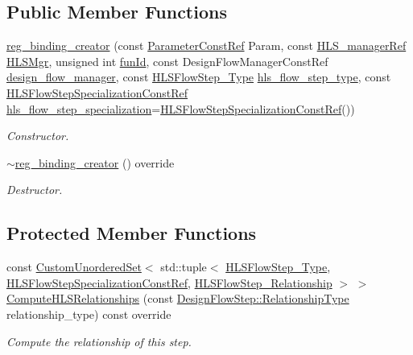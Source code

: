 \subsection*{Public Member Functions}
\begin{DoxyCompactItemize}
\item 
\hyperlink{classreg__binding__creator_a2bb802408ad2ffe32277d65edf50d171}{reg\+\_\+binding\+\_\+creator} (const \hyperlink{Parameter_8hpp_a37841774a6fcb479b597fdf8955eb4ea}{Parameter\+Const\+Ref} Param, const \hyperlink{hls__manager_8hpp_acd3842b8589fe52c08fc0b2fcc813bfe}{H\+L\+S\+\_\+manager\+Ref} \hyperlink{classHLS__step_ade85003a99d34134418451ddc46a18e9}{H\+L\+S\+Mgr}, unsigned int \hyperlink{classHLSFunctionStep_a3e6434fd86c698b0c70520b859bff5b0}{fun\+Id}, const Design\+Flow\+Manager\+Const\+Ref \hyperlink{classDesignFlowStep_ab770677ddf087613add30024e16a5554}{design\+\_\+flow\+\_\+manager}, const \hyperlink{hls__step_8hpp_ada16bc22905016180e26fc7e39537f8d}{H\+L\+S\+Flow\+Step\+\_\+\+Type} \hyperlink{classHLS__step_aefd59af15346ec3f10bf12bd756e6777}{hls\+\_\+flow\+\_\+step\+\_\+type}, const \hyperlink{hls__step_8hpp_a5fdd2edf290c196531d21d68e13f0e74}{H\+L\+S\+Flow\+Step\+Specialization\+Const\+Ref} \hyperlink{classHLS__step_a843be75ba53b81876aa3c8b870ae8a55}{hls\+\_\+flow\+\_\+step\+\_\+specialization}=\hyperlink{hls__step_8hpp_a5fdd2edf290c196531d21d68e13f0e74}{H\+L\+S\+Flow\+Step\+Specialization\+Const\+Ref}())
\begin{DoxyCompactList}\small\item\em Constructor. \end{DoxyCompactList}\item 
\hyperlink{classreg__binding__creator_a073339d21f4163ffff97540b2a787281}{$\sim$reg\+\_\+binding\+\_\+creator} () override
\begin{DoxyCompactList}\small\item\em Destructor. \end{DoxyCompactList}\end{DoxyCompactItemize}
\subsection*{Protected Member Functions}
\begin{DoxyCompactItemize}
\item 
const \hyperlink{classCustomUnorderedSet}{Custom\+Unordered\+Set}$<$ std\+::tuple$<$ \hyperlink{hls__step_8hpp_ada16bc22905016180e26fc7e39537f8d}{H\+L\+S\+Flow\+Step\+\_\+\+Type}, \hyperlink{hls__step_8hpp_a5fdd2edf290c196531d21d68e13f0e74}{H\+L\+S\+Flow\+Step\+Specialization\+Const\+Ref}, \hyperlink{hls__step_8hpp_a3ad360b9b11e6bf0683d5562a0ceb169}{H\+L\+S\+Flow\+Step\+\_\+\+Relationship} $>$ $>$ \hyperlink{classreg__binding__creator_a507cb435a1f0b4ccde1242aa6b930ea6}{Compute\+H\+L\+S\+Relationships} (const \hyperlink{classDesignFlowStep_a723a3baf19ff2ceb77bc13e099d0b1b7}{Design\+Flow\+Step\+::\+Relationship\+Type} relationship\+\_\+type) const override
\begin{DoxyCompactList}\small\item\em Compute the relationship of this step. \end{DoxyCompactList}\end{DoxyCompactItemize}
